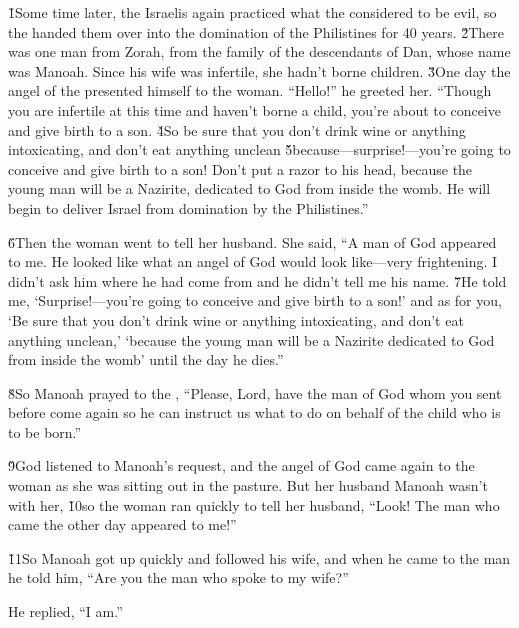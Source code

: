 \v{1}Some time later, the Israelis again practiced what the  considered to be evil, so the  handed them over into the domination of the Philistines for 40 years. \v{2}There was one man from Zorah, from the family of the descendants of Dan, whose name was Manoah. Since his wife was infertile, she hadn't borne children. \v{3}One day the angel of the  presented himself to the woman. ``Hello!'' he greeted her. ``Though you are infertile at this time and haven't borne a child, you're about to conceive and give birth to a son. \v{4}So be sure that you don't drink wine or anything intoxicating, and don't eat anything unclean \v{5}because---surprise!---you're going to conceive and give birth to a son! Don't put a razor to his head, because the young man will be a Nazirite, dedicated to God from inside the womb. He will begin to deliver Israel from domination by the Philistines.''

\v{6}Then the woman went to tell her husband. She said, ``A man of God appeared to me. He looked like what an angel of God would look like---very frightening. I didn't ask him where he had come from and he didn't tell me his name. \v{7}He told me, `Surprise!---you're going to conceive and give birth to a son!' and as for you, `Be sure that you don't drink wine or anything intoxicating, and don't eat anything unclean,' `because the young man will be a Nazirite dedicated to God from inside the womb' until the day he dies.''

\v{8}So Manoah prayed to the , ``Please, Lord, have the man of God whom you sent before come again so he can instruct us what to do on behalf of the child who is to be born.''

\v{9}God listened to Manoah's request, and the angel of God came again to the woman as she was sitting out in the pasture. But her husband Manoah wasn't with her, \v{10}so the woman ran quickly to tell her husband, ``Look! The man who came the other day appeared to me!''

\v{11}So Manoah got up quickly and followed his wife, and when he came to the man he told him, ``Are you the man who spoke to my wife?''

He replied, ``I am.''

